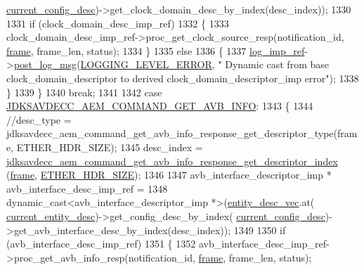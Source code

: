 \begin{DoxyCode}
{{{      \hyperlink{classavdecc__lib_1_1end__station__imp_a60b1af40d35e8a86b0082c54ab6cb6a8}{current\_config\_desc})->get\_clock\_domain\_desc\_by\_index(desc\_index));
1330 
1331         \textcolor{keywordflow}{if} (clock\_domain\_desc\_imp\_ref)
1332         \{
1333             clock\_domain\_desc\_imp\_ref->proc\_get\_clock\_source\_resp(notification\_id, 
      \hyperlink{gst__avb__playbin_8c_ac8e710e0b5e994c0545d75d69868c6f0}{frame}, frame\_len, status);
1334         \}
1335         \textcolor{keywordflow}{else}
1336         \{
1337             \hyperlink{namespaceavdecc__lib_acbe3e2a96ae6524943ca532c87a28529}{log\_imp\_ref}->\hyperlink{classavdecc__lib_1_1log_a68139a6297697e4ccebf36ccfd02e44a}{post\_log\_msg}(\hyperlink{namespaceavdecc__lib_a501055c431e6872ef46f252ad13f85cdaf2c4481208273451a6f5c7bb9770ec8a}{LOGGING\_LEVEL\_ERROR}, \textcolor{stringliteral}{"
      Dynamic cast from base clock\_domain\_descriptor to derived clock\_domain\_descriptor\_imp error"});
1338         \}
1339     \}
1340     \textcolor{keywordflow}{break};
1341 
1342     \textcolor{keywordflow}{case} \hyperlink{group__command_ga0ef8e645e0859b9d44e25cf1cbd0ce60}{JDKSAVDECC\_AEM\_COMMAND\_GET\_AVB\_INFO}:
1343     \{
1344         \textcolor{comment}{//desc\_type = jdksavdecc\_aem\_command\_get\_avb\_info\_response\_get\_descriptor\_type(frame,
       ETHER\_HDR\_SIZE);}
1345         desc\_index = 
      \hyperlink{group__command__get__avb__info__response_gad4356122ebdad47f8c63588a4c48d2e7}{jdksavdecc\_aem\_command\_get\_avb\_info\_response\_get\_descriptor\_index}
      (\hyperlink{gst__avb__playbin_8c_ac8e710e0b5e994c0545d75d69868c6f0}{frame}, \hyperlink{namespaceavdecc__lib_a6c827b1a0d973e18119c5e3da518e65ca9512ad9b34302ba7048d88197e0a2dc0}{ETHER\_HDR\_SIZE});
1346 
1347         avb\_interface\_descriptor\_imp * avb\_interface\_desc\_imp\_ref =
1348             \textcolor{keyword}{dynamic\_cast<}avb\_interface\_descriptor\_imp *\textcolor{keyword}{>}(\hyperlink{classavdecc__lib_1_1end__station__imp_a72edab41bc56e3c1757944a7df188a3d}{entity\_desc\_vec}.at(
      \hyperlink{classavdecc__lib_1_1end__station__imp_afd78c89df26ba7641e1adb764c0e827d}{current\_entity\_desc})->get\_config\_desc\_by\_index(
      \hyperlink{classavdecc__lib_1_1end__station__imp_a60b1af40d35e8a86b0082c54ab6cb6a8}{current\_config\_desc})->get\_avb\_interface\_desc\_by\_index(desc\_index));
1349 
1350         \textcolor{keywordflow}{if} (avb\_interface\_desc\_imp\_ref)
1351         \{
1352             avb\_interface\_desc\_imp\_ref->proc\_get\_avb\_info\_resp(notification\_id, 
      \hyperlink{gst__avb__playbin_8c_ac8e710e0b5e994c0545d75d69868c6f0}{frame}, frame\_len, status);
}}}
\end{DoxyCode}
